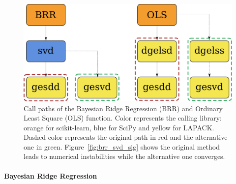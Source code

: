 \documentclass[10pt,journal,compsoc]{IEEEtran}
\begin{document}


\begin{figure}
    \centering
    \includegraphics[width=0.5\linewidth]{figure/BRR/call_path.pdf}
    \caption{Call paths of the Bayesian Ridge Regression (BRR) and
        Ordinary Least Square (OLS) function. Color represents the calling library:
        orange for scikit-learn, blue for SciPy and yellow for LAPACK.
        Dashed color represents the original path in red and the alternative one in green.
        Figure~\ref{fig:brr_svd_sig} shows the original method  leads to numerical instabilities while the alternative one converges.
    }
    \label{fig:call_path_brr}
\end{figure}

\paragraph{Bayesian Ridge Regression}
\end{document}
